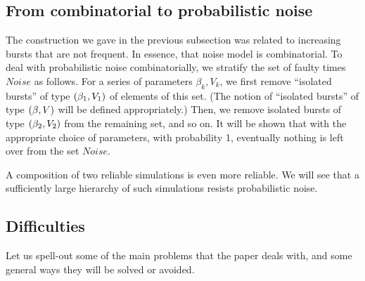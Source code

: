 \documentclass[12pt]{memoir}
\newcommand{\Noise}{\mathit{Noise}}
\begin{document}
\subsection{From combinatorial to probabilistic noise}

The construction we gave in the previous subsection
was related to increasing bursts that are not frequent.
In essence, that noise model is combinatorial.
To deal with probabilistic noise combinatorially,
we stratify the set of faulty times \( \Noise \) as follows.
For a series of parameters \( \beta_{k}, V_{k} \),
we first remove ``isolated bursts'' of type \( (\beta_{1},V_{1}) \) of elements of this set.
(The notion of ``isolated bursts'' of type \( (\beta,V) \)
will be defined appropriately.)
Then, we remove isolated bursts of type \( (\beta_{2},V_{2}) \) from the remaining set,
and so on.
It will be shown that with the appropriate choice of parameters, with probability 1,
eventually nothing is left over from the set \( \Noise \).

A composition of two reliable simulations is even more reliable.
We will see that a sufficiently large hierarchy of such
simulations resists probabilistic noise.


\subsection{Difficulties}\label{sec:novelties}

Let us spell-out some of the main problems that the paper deals with, 
and some general ways they will be solved or avoided.
\end{document}
